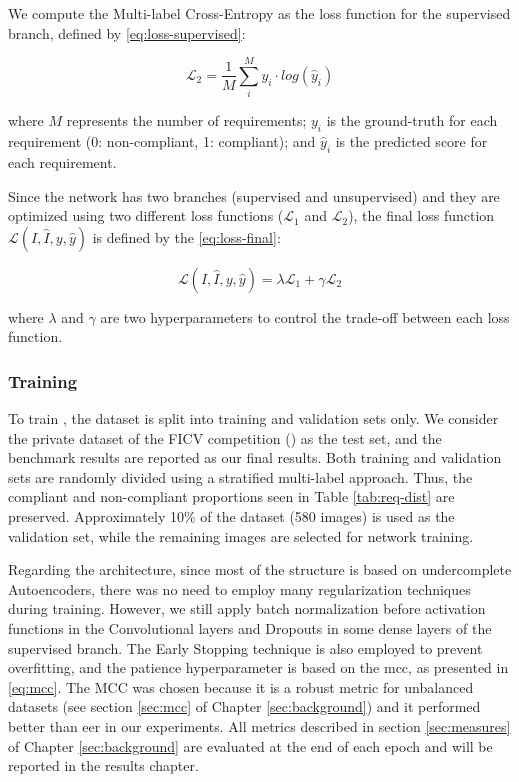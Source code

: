 We compute the Multi-label Cross-Entropy as the loss function for the supervised branch, defined by \autoref{eq:loss-supervised}:

\begin{equation}
\label{eq:loss-supervised}
\mathcal{L}_2 = \frac{1}{M} \sum_i^M {y_i \cdot log(\hat{y}_i)}
\end{equation}

\noindent where $M$ represents the number of requirements; $y_i$ is the ground-truth for each requirement (0: non-compliant, 1: compliant); and $\hat{y}_i$ is the predicted score for each requirement.

Since the network has two branches (supervised and unsupervised) and they are optimized using two different loss functions ($\mathcal{L}_1$ and $\mathcal{L}_2$), the final loss function $\mathcal{L}(I, \hat{I}, y, \hat{y})$ is defined by the \autoref{eq:loss-final}:

\begin{equation}
\label{eq:loss-final}
\mathcal{L}(I, \hat{I}, y, \hat{y}) = \lambda\mathcal{L}_1 + \gamma\mathcal{L}_2
\end{equation}

\noindent where $\lambda$ and $\gamma$ are two hyperparameters to control the trade-off between each loss function.

\subsubsection{Training} 

To train \methodname, the \ficvtest dataset is split into training and validation sets only. We consider the private dataset of the FICV competition (\ficvofficial) as the test set, and the benchmark results are reported as our final results. Both training and validation sets are randomly divided using a stratified multi-label approach. Thus, the compliant and non-compliant proportions seen in Table \ref{tab:req-dist} are preserved. Approximately 10\% of the dataset (580 images) is used as the validation set, while the remaining images are selected for network training.

Regarding the architecture, since most of the \methodname structure is based on undercomplete Autoencoders, there was no need to employ many regularization techniques during training. However, we still apply batch normalization before activation functions in the Convolutional layers and Dropouts in some dense layers of the supervised branch. The Early Stopping technique is also employed to prevent overfitting, and the patience hyperparameter is based on the \acl{mcc}, as presented in \autoref{eq:mcc}. The MCC was chosen because it is a robust metric for unbalanced datasets (see section \ref{sec:mcc} of Chapter \ref{sec:background}) and it performed better than \acs{eer} in our experiments. All metrics described in section \ref{sec:measures} of Chapter \ref{sec:background} are evaluated at the end of each epoch and will be reported in the results chapter.

